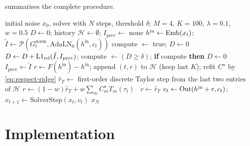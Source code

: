  summarises the complete procedure.

\begin{algorithm}[t]
\caption{ReSPect sampling (one sample)}\label{alg:respect}
\begin{algorithmic}[1]
\Require initial noise $x_0$, solver with $N$ steps, threshold $\delta$; $M{=}4$, $K{=}100$, $\lambda{=}0.1$, $w{=}0.5$
\State $D\gets 0$; history $\mathcal H\gets\emptyset$; $I_{\mathrm{prev}}\gets$ none
  \State $h^{\mathrm{in}}\gets \mathrm{Emb}(x_t)$; \quad $\tilde I\gets \mathcal P(G^{\mathrm{norm}}_t, \mathrm{AdaLN}_0(h^{\mathrm{in}}, c_t))$
     \State compute $\gets$ true; $D\gets0$
  \Else
     \State $D\gets D+\mathrm{L1}_{\mathrm{rel}}(\tilde I, I_{\mathrm{prev}})$; \quad compute $\gets (D\ge\delta)$; \textbf{if} compute \textbf{then} $D\gets 0$
  \EndIf
  \State $I_{\mathrm{prev}}\gets\tilde I$ 
     \State $r\gets F(h^{\mathrm{in}})-h^{\mathrm{in}}$; append $(t,r)$ to $\mathcal H$ (keep last $K$); refit $C^\star$ by \cref{eq:respect-ridge}
  \Else
     \State $\hat r_T\gets$ first-order discrete Taylor step from the last two entries of $\mathcal H$
      $r\gets(1-w)\hat r_T + w\sum_m C^\star_m T_m(\tau_t)$ \Else\ $r\gets\hat r_T$ \EndIf
  \EndIf
  \State $v_t\gets\mathrm{Out}(h^{\mathrm{in}}+r, c_t)$; \quad $x_{t+1}\gets\mathrm{SolverStep}(x_t, v_t)$
\EndFor
\State \Return $x_N$
\end{algorithmic}
\end{algorithm}

\section{Implementation}\label{sec:respect-impl}


